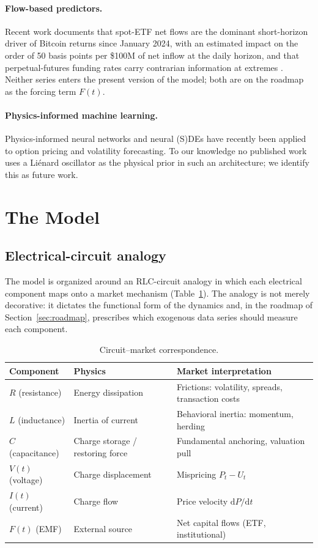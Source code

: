 \documentclass[11pt,a4paper]{article}
\newcommand{\dd}{\mathrm{d}}
\begin{document}
\paragraph{Flow-based predictors.} Recent work documents that spot-ETF net flows are the dominant short-horizon driver of Bitcoin returns since January 2024, with an estimated impact on the order of 50 basis points per \$100M of net inflow at the daily horizon, and that perpetual-futures funding rates carry contrarian information at extremes \citep{schmeling2023crypto}. Neither series enters the present version of the model; both are on the roadmap as the forcing term $F(t)$.

\paragraph{Physics-informed machine learning.} Physics-informed neural networks and neural (S)DEs have recently been applied to option pricing and volatility forecasting. To our knowledge no published work uses a Li\'enard oscillator as the physical prior in such an architecture; we identify this as future work.

\section{The Model}\label{sec:model}

\subsection{Electrical-circuit analogy}

The model is organized around an RLC-circuit analogy in which each electrical component maps onto a market mechanism (Table~\ref{tab:analogy}). The analogy is not merely decorative: it dictates the functional form of the dynamics and, in the roadmap of Section~\ref{sec:roadmap}, prescribes which exogenous data series should measure each component.

\begin{table}[H]
\centering\small
\caption{Circuit--market correspondence.}
\label{tab:analogy}
\begin{tabular}{lll}
\toprule
Component & Physics & Market interpretation \\
\midrule
$R$ (resistance) & Energy dissipation & Frictions: volatility, spreads, transaction costs \\
$L$ (inductance) & Inertia of current & Behavioral inertia: momentum, herding \\
$C$ (capacitance) & Charge storage / restoring force & Fundamental anchoring, valuation pull \\
$V(t)$ (voltage) & Charge displacement & Mispricing $P_t - U_t$ \\
$I(t)$ (current) & Charge flow & Price velocity $\dd P/\dd t$ \\
$F(t)$ (EMF) & External source & Net capital flows (ETF, institutional) \\
\bottomrule
\end{tabular}
\end{table}
\end{document}
